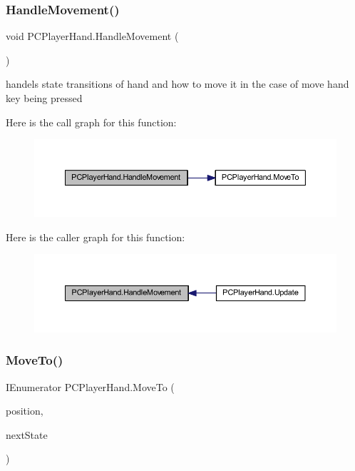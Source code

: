 \subsubsection{\texorpdfstring{Handle\+Movement()}{HandleMovement()}}
{\footnotesize\ttfamily void P\+C\+Player\+Hand.\+Handle\+Movement (\begin{DoxyParamCaption}{ }\end{DoxyParamCaption})\hspace{0.3cm}{\ttfamily [private]}}



handels state transitions of hand and how to move it in the case of move hand key being pressed 

Here is the call graph for this function\+:\nopagebreak
\begin{figure}[H]
\begin{center}
\leavevmode
\includegraphics[width=350pt]{class_p_c_player_hand_a81d7137403650fb8da125b6356d50496_cgraph}
\end{center}
\end{figure}
Here is the caller graph for this function\+:\nopagebreak
\begin{figure}[H]
\begin{center}
\leavevmode
\includegraphics[width=350pt]{class_p_c_player_hand_a81d7137403650fb8da125b6356d50496_icgraph}
\end{center}
\end{figure}
\mbox{\label{class_p_c_player_hand_a338f6e5898a4953d48c046354ffef9e2}} 
\subsubsection{\texorpdfstring{Move\+To()}{MoveTo()}}
{\footnotesize\ttfamily I\+Enumerator P\+C\+Player\+Hand.\+Move\+To (\begin{DoxyParamCaption}\item[{Vector3}]{position,  }\item[{\mbox{\hyperlink{class_player_hand_a1af76750da713cbc88856161d8d5ac0e}{Hand\+State}}}]{next\+State }\end{DoxyParamCaption})\hspace{0.3cm}{\ttfamily [private]}}



